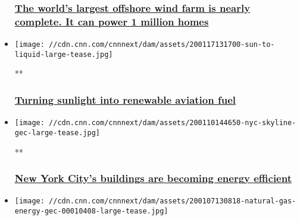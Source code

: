 \begin{itemize}
  \hypertarget{the-worlds-largest-offshore-wind-farm-is-nearly-complete-it-can-power-1-million-homes-1}{%
  \subsubsection{\texorpdfstring{\href{/2019/09/25/business/worlds-largest-wind-farm/index.html}{The
  world's largest offshore wind farm is nearly complete. It can power 1
  million
  homes}}{The world's largest offshore wind farm is nearly complete. It can power 1 million homes}}\label{the-worlds-largest-offshore-wind-farm-is-nearly-complete-it-can-power-1-million-homes-1}}
\item
  \href{/videos/business/2020/01/17/solar-kerosene-energy-gec.cnn-business}{}

  \texttt{[image: //cdn.cnn.com/cnnnext/dam/assets/200117131700-sun-to-liquid-large-tease.jpg]}

  **

  \hypertarget{turning-sunlight-into-renewable-aviation-fuel}{%
  \subsubsection{\texorpdfstring{\href{/videos/business/2020/01/17/solar-kerosene-energy-gec.cnn-business}{Turning
  sunlight into renewable aviation
  fuel}}{Turning sunlight into renewable aviation fuel}}\label{turning-sunlight-into-renewable-aviation-fuel}}
\item
  \href{/videos/business/2020/01/10/new-york-city-buildings-energy-gec.cnn-business}{}

  \texttt{[image: //cdn.cnn.com/cnnnext/dam/assets/200110144650-nyc-skyline-gec-large-tease.jpg]}

  **

  \hypertarget{new-york-citys-buildings-are-becoming-energy-efficient}{%
  \subsubsection{\texorpdfstring{\href{/videos/business/2020/01/10/new-york-city-buildings-energy-gec.cnn-business}{New
  York City's buildings are becoming energy
  efficient}}{New York City's buildings are becoming energy efficient}}\label{new-york-citys-buildings-are-becoming-energy-efficient}}
\item
  \href{/videos/business/2020/01/07/natural-gas-energy-gec.cnn-business}{}

  \texttt{[image: //cdn.cnn.com/cnnnext/dam/assets/200107130818-natural-gas-energy-gec-00010408-large-tease.jpg]}


\end{itemize}
